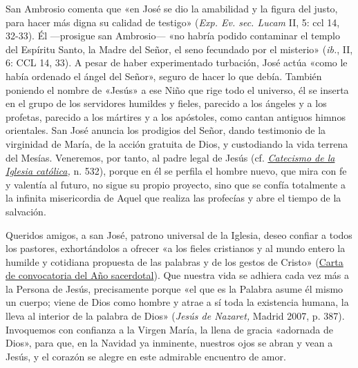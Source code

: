 \documentclass[]{article}
\begin{document}
San Ambrosio comenta que «en José se dio la amabilidad y la figura del
justo, para hacer más digna su calidad de testigo» (\emph{Exp. Ev. sec.
Lucam} II, 5: ccl 14, 32-33). Él ---prosigue san Ambrosio--- «no habría
podido contaminar el templo del Espíritu Santo, la Madre del Señor, el
seno fecundado por el misterio» (\emph{ib.}, II, 6: CCL 14, 33). A pesar
de haber experimentado turbación, José actúa «como le había ordenado el
ángel del Señor», seguro de hacer lo que debía. También poniendo el
nombre de «Jesús» a ese Niño que rige todo el universo, él se inserta en
el grupo de los servidores humildes y fieles, parecido a los ángeles y a
los profetas, parecido a los mártires y a los apóstoles, como cantan
antiguos himnos orientales. San José anuncia los prodigios del Señor,
dando testimonio de la virginidad de María, de la acción gratuita de
Dios, y custodiando la vida terrena del Mesías. Veneremos, por tanto, al
padre legal de Jesús (cf.
\emph{\href{http://www.vatican.va/archive/catechism_sp/p122a3p3_sp.html\#II\%20Los\%20misterios\%20de\%20la\%20infancia\%20y\%20de\%20la\%20vida\%20oculta\%20de\%20Jes\%C3\%BAs}{Catecismo
de la Iglesia católica},} n. 532), porque en él se perfila el hombre
nuevo, que mira con fe y valentía al futuro, no sigue su propio
proyecto, sino que se confía totalmente a la infinita misericordia de
Aquel que realiza las profecías y abre el tiempo de la salvación.

Queridos amigos, a san José, patrono universal de la Iglesia, deseo
confiar a todos los pastores, exhortándolos a ofrecer «a los fieles
cristianos y al mundo entero la humilde y cotidiana propuesta de las
palabras y de los gestos de Cristo»
(\href{https://www.deiverbum.org/content/benedict-xvi/es/letters/2009/documents/hf_ben-xvi_let_20090616_anno-sacerdotale.html}{Carta
de convocatoria del Año sacerdotal}). Que nuestra vida se adhiera cada
vez más a la Persona de Jesús, precisamente porque «el que es la Palabra
asume él mismo un cuerpo; viene de Dios como hombre y atrae a sí toda la
existencia humana, la lleva al interior de la palabra de Dios»
(\emph{Jesús de Nazaret,} Madrid 2007, p. 387). Invoquemos con confianza
a la Virgen María, la llena de gracia «adornada de Dios», para que, en
la Navidad ya inminente, nuestros ojos se abran y vean a Jesús, y el
corazón se alegre en este admirable encuentro de
amor.\protect\hypertarget{_Toc448662763}{}{\protect\hypertarget{_Toc448690282}{}{\protect\hypertarget{_Toc448708305}{}{\protect\hypertarget{_Toc448709391}{}{\protect\hypertarget{_Toc449554393}{}{}}}}}
\end{document}
